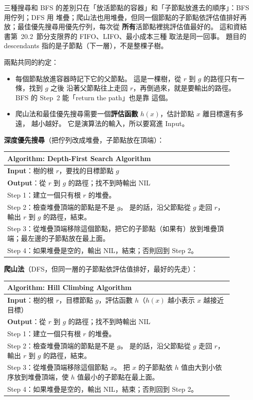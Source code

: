 \begin{pastsoln}
三種搜尋和 BFS 的差別只在「放活節點的容器」和「子節點放進去的順序」：BFS 用佇列；DFS 用
堆疊；爬山法也用堆疊，但同一個節點的子節點依評估值排好再放；最佳優先搜尋用優先佇列，每次從
\textbf{所有}活節點裡挑評估值最好的。 這和資結書第~20.2~節分支限界的 FIFO、LIFO、最小成本三種
取法是同一回事。 題目的 descendants 指的是子節點（下一層），不是整棵子樹。

兩點共同的約定：
\begin{itemize}
\item 每個節點放進容器時記下它的父節點。 這是一棵樹，從 $r$ 到 $g$ 的路徑只有一條，找到 $g$ 之後
沿著父節點往上走回 $r$，再倒過來，就是要輸出的路徑。 BFS 的 Step~2 能「return the path」也是靠
這個。
\item 爬山法和最佳優先搜尋需要一個\textbf{評估函數} $h(x)$，估計節點 $x$ 離目標還有多遠，
越小越好。 它是演算法的輸入，所以要寫進 Input。
\end{itemize}

\textbf{深度優先搜尋}（把佇列改成堆疊，子節點放在頂端）：
\begin{center}
\small
\begin{tabular}{|p{0.92\linewidth}|}
\hline
\textbf{Algorithm:} Depth-First Search Algorithm\\ \hline
\textbf{Input}：樹的根 $r$，要找的目標節點 $g$\\
\textbf{Output}：從 $r$ 到 $g$ 的路徑；找不到時輸出 NIL\\ \hline
Step 1：建立一個只有根 $r$ 的堆疊。\\
Step 2：檢查堆疊頂端的節點是不是 $g$。 是的話，沿父節點從 $g$ 走回 $r$，輸出 $r$ 到 $g$ 的路徑，結束。\\
Step 3：從堆疊頂端移除這個節點，把它的子節點（如果有）放到堆疊頂端；最左邊的子節點放在最上面。\\
Step 4：如果堆疊是空的，輸出 NIL，結束；否則回到 Step 2。\\ \hline
\end{tabular}
\end{center}

\textbf{爬山法}（DFS，但同一層的子節點依評估值排好，最好的先走）：
\begin{center}
\small
\begin{tabular}{|p{0.92\linewidth}|}
\hline
\textbf{Algorithm:} Hill Climbing Algorithm\\ \hline
\textbf{Input}：樹的根 $r$，目標節點 $g$，評估函數 $h$（$h(x)$ 越小表示 $x$ 越接近目標）\\
\textbf{Output}：從 $r$ 到 $g$ 的路徑；找不到時輸出 NIL\\ \hline
Step 1：建立一個只有根 $r$ 的堆疊。\\
Step 2：檢查堆疊頂端的節點是不是 $g$。 是的話，沿父節點從 $g$ 走回 $r$，輸出 $r$ 到 $g$ 的路徑，結束。\\
Step 3：從堆疊頂端移除這個節點 $x$。 把 $x$ 的子節點依 $h$ 值由大到小依序放到堆疊頂端，使 $h$ 值最小的子節點在最上面。\\
Step 4：如果堆疊是空的，輸出 NIL，結束；否則回到 Step 2。\\ \hline
\end{tabular}
\end{center}


\end{pastsoln}
